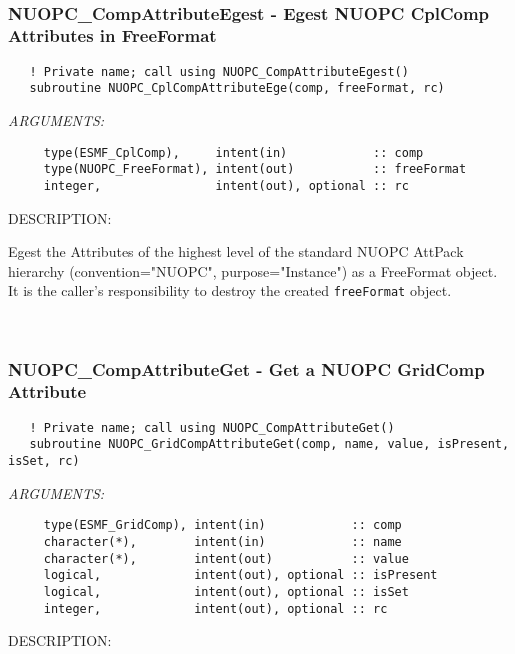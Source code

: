 \mbox{}\hrulefill\ 
 
\subsubsection [NUOPC\_CompAttributeEgest] {NUOPC\_CompAttributeEgest - Egest NUOPC CplComp Attributes in FreeFormat}


\begin{verbatim}   ! Private name; call using NUOPC_CompAttributeEgest() 
   subroutine NUOPC_CplCompAttributeEge(comp, freeFormat, rc)\end{verbatim}{\em ARGUMENTS:}
\begin{verbatim}     type(ESMF_CplComp),     intent(in)            :: comp
     type(NUOPC_FreeFormat), intent(out)           :: freeFormat
     integer,                intent(out), optional :: rc\end{verbatim}
{\sf DESCRIPTION:\\ }


     Egest the Attributes of the highest level of the standard NUOPC AttPack
     hierarchy (convention="NUOPC", purpose="Instance") as a FreeFormat object.
     It is the caller's responsibility to destroy the created {\tt freeFormat}
     object. 
 
\mbox{}\hrulefill\ 
 
\subsubsection [NUOPC\_CompAttributeGet] {NUOPC\_CompAttributeGet - Get a NUOPC GridComp Attribute}


\begin{verbatim}   ! Private name; call using NUOPC_CompAttributeGet() 
   subroutine NUOPC_GridCompAttributeGet(comp, name, value, isPresent, isSet, rc)\end{verbatim}{\em ARGUMENTS:}
\begin{verbatim}     type(ESMF_GridComp), intent(in)            :: comp
     character(*),        intent(in)            :: name
     character(*),        intent(out)           :: value
     logical,             intent(out), optional :: isPresent
     logical,             intent(out), optional :: isSet
     integer,             intent(out), optional :: rc\end{verbatim}
{\sf DESCRIPTION:\\ }



